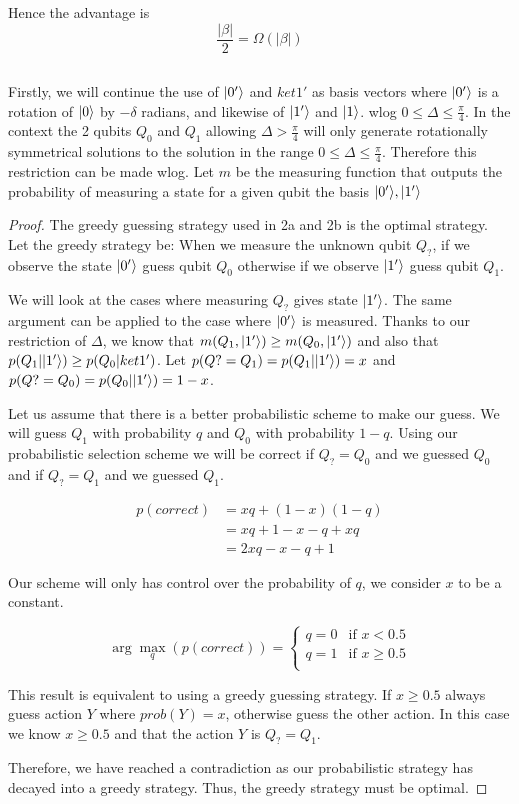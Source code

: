 Hence the advantage is
\[
    \frac{|\beta|}{2}=\Omega(|\beta|)
\]



\subsection{}
Firstly, we will continue the use of $\lvert0'\rangle$ and $ket{1'}$ as basis vectors where $\lvert0'\rangle$ is a rotation of $\lvert0\rangle$ by $-\delta$ radians, and likewise of $\lvert1'\rangle$ and $\lvert1\rangle$.
wlog $0 \leq \Delta \leq \frac{\pi}{4}$.
In the context the 2 qubits $Q_0$ and $Q_1$ allowing $\Delta>\frac{\pi}{4}$ will only generate rotationally symmetrical solutions to the solution in the range $0 \leq \Delta \leq \frac{\pi}{4}$.
Therefore this restriction can be made wlog.
Let $m$ be the measuring function that outputs the probability of measuring a state for a given qubit the basis $\lvert0'\rangle, \lvert1'\rangle$ 

\begin{proof} The greedy guessing strategy used in 2a and 2b is the optimal strategy.
Let the greedy strategy be: When we measure the unknown qubit $Q_?$, if we observe the state $\lvert0'\rangle$ guess qubit $Q_0$ otherwise if we observe $\lvert1'\rangle$ guess qubit $Q_1$.

We will look at the cases where measuring $Q_?$ gives state $\lvert1'\rangle$.
The same argument can be applied to the case where $\lvert0'\rangle$ is measured.
Thanks to our restriction of $\Delta$, we know that $m(Q_1, \lvert1'\rangle)\geq m(Q_0, \lvert1'\rangle)$ and also that $p(Q_1|\lvert1'\rangle) \geq p(Q_0|ket{1'})$.
Let $p(Q? = Q_1) = p(Q_1|\lvert1'\rangle) = x$ and $p(Q? = Q_0) = p(Q_0|\lvert1'\rangle) = 1-x$.

Let us assume that there is a better probabilistic scheme to make our guess.
We will guess $Q_1$ with probability $q$ and $Q_0$ with probability $1-q$.
Using our probabilistic selection scheme we will be correct if $Q_?=Q_0$ and we guessed $Q_0$ and if $Q_?=Q_1$ and we guessed $Q_1$.

\begin{align*}
    p(correct) &= xq + (1-x)(1-q)\\
    &= xq + 1-x-q+xq\\
    &= 2xq-x-q+1
\end{align*}

Our scheme will only has control over the probability of $q$, we consider $x$ to be a constant.

\[
    \arg \max_q(p(correct)) = \begin{cases}
        q = 0 & \text{if } x<0.5\\
        q = 1 & \text{if } x\geq 0.5\\
    \end{cases}
\]

This result is equivalent to using a greedy guessing strategy.
If $x\geq 0.5$ always guess action $Y$ where $prob(Y)=x$, otherwise guess the other action.
In this case we know $x\geq 0.5$ and that the action $Y$ is $Q_? = Q_1$.

Therefore, we have reached a contradiction as our probabilistic strategy has decayed into a greedy strategy.
Thus, the greedy strategy must be optimal. 
\end{proof}

